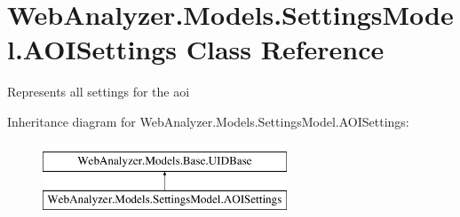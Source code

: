 \hypertarget{class_web_analyzer_1_1_models_1_1_settings_model_1_1_a_o_i_settings}{}\section{Web\+Analyzer.\+Models.\+Settings\+Model.\+A\+O\+I\+Settings Class Reference}
\label{class_web_analyzer_1_1_models_1_1_settings_model_1_1_a_o_i_settings}


Represents all settings for the aoi  


Inheritance diagram for Web\+Analyzer.\+Models.\+Settings\+Model.\+A\+O\+I\+Settings\+:\begin{figure}[H]
\begin{center}
\leavevmode
\includegraphics[height=2.000000cm]{class_web_analyzer_1_1_models_1_1_settings_model_1_1_a_o_i_settings}
\end{center}
\end{figure}
